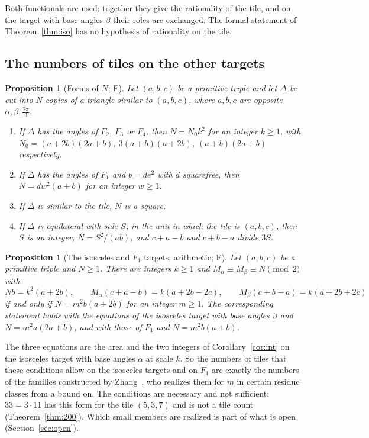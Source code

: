 \documentclass[11pt,reqno]{amsart}
\theoremstyle{plain}
\newtheorem{proposition}[theorem]{Proposition}
\theoremstyle{definition}
\newcommand{\sF}{\textup{\textsf{F}}}
\begin{document}
Both functionals are used: together they give the rationality of the tile, and on the target with base
angles $\beta$ their roles are exchanged. The formal statement of Theorem~\ref{thm:iso} has no hypothesis of
rationality on the tile.

\subsection{The numbers of tiles on the other targets}

\begin{proposition}[Forms of $N$; \sF]\label{prop:forms}
Let $(a,b,c)$ be a primitive triple and let $\Delta$ be cut into $N$ copies of a triangle similar to
$(a,b,c)$, where $a,b,c$ are opposite $\alpha,\beta,\frac{2\pi}3$.
\begin{enumerate}
\item[\textup{(i)}] If $\Delta$ has the angles of $F_2$, $F_3$ or $F_4$, then $N=N_0k^2$ for an integer
$k\ge1$, with $N_0=(a+2b)(2a+b)$, $3(a+b)(a+2b)$, $(a+b)(2a+b)$ respectively.
\item[\textup{(ii)}] If $\Delta$ has the angles of $F_1$ and $b=de^2$ with $d$ squarefree, then
$N=dw^2(a+b)$ for an integer $w\ge1$.
\item[\textup{(iii)}] If $\Delta$ is similar to the tile, $N$ is a square.
\item[\textup{(iv)}] If $\Delta$ is equilateral with side $S$, in the unit in which the tile is $(a,b,c)$,
then $S$ is an integer, $N=S^2/(ab)$, and $c+a-b$ and $c+b-a$ divide $3S$.
\end{enumerate}
\end{proposition}

\begin{proposition}[The isosceles and $F_1$ targets; arithmetic; \sF]\label{prop:spectrum}
Let $(a,b,c)$ be a primitive triple and $N\ge1$. There are integers $k\ge1$ and
$M_\alpha\equiv M_\beta\equiv N\pmod2$ with
\[
Nb=k^2(a+2b),\qquad M_\alpha(c+a-b)=k(a+2b-2c),\qquad M_\beta(c+b-a)=k(a+2b+2c)
\]
if and only if $N=m^2b(a+2b)$ for an integer $m\ge1$. The corresponding statement holds with the equations
of the isosceles target with base angles $\beta$ and $N=m^2a(2a+b)$, and with those of $F_1$ and
$N=m^2b(a+b)$.
\end{proposition}

The three equations are the area and the two integers of Corollary~\ref{cor:int} on the isosceles target
with base angles $\alpha$ at scale $k$. So the numbers of tiles that these conditions allow on the isosceles
targets and on $F_1$ are exactly the numbers of the families constructed by Zhang~\cite{Zhang}, who
realizes them for $m$ in certain residue classes from a bound on. The conditions are necessary and not
sufficient: $33=3\cdot11$ has this form for the tile $(5,3,7)$ and is not a tile count
(Theorem~\ref{thm:200}). Which small members are realized is part of what is open
(Section~\ref{sec:open}).
\end{document}
